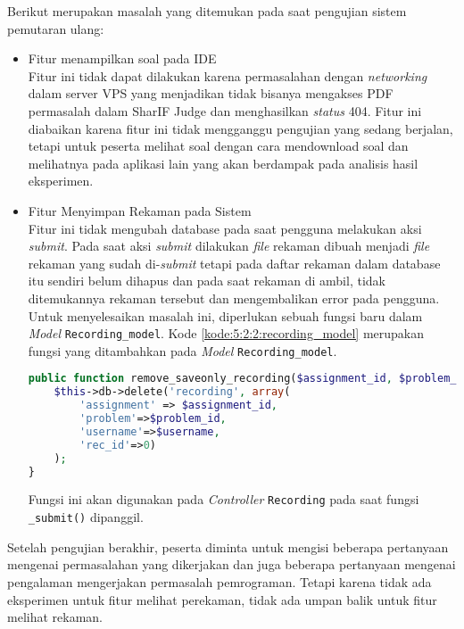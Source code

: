 Berikut merupakan masalah yang ditemukan pada saat pengujian sistem pemutaran ulang:

\begin{itemize}
    \item Fitur menampilkan soal pada IDE \\
    Fitur ini tidak dapat dilakukan karena permasalahan dengan \textit{networking} dalam server VPS yang menjadikan tidak bisanya mengakses PDF permasalah dalam SharIF Judge dan menghasilkan \textit{status} 404. Fitur ini diabaikan karena fitur ini tidak mengganggu pengujian yang sedang berjalan, tetapi untuk peserta melihat soal dengan cara mendownload soal dan melihatnya pada aplikasi lain yang akan berdampak pada analisis hasil eksperimen.
    \item Fitur Menyimpan Rekaman pada Sistem \\
    Fitur ini tidak mengubah database pada saat pengguna melakukan aksi \textit{submit}. Pada saat aksi \textit{submit} dilakukan \textit{file} rekaman dibuah menjadi \textit{file} rekaman yang sudah di-\textit{submit} tetapi pada daftar rekaman dalam database itu sendiri belum dihapus dan pada saat rekaman di ambil, tidak ditemukannya rekaman tersebut dan mengembalikan error pada pengguna. Untuk menyelesaikan masalah ini, diperlukan sebuah fungsi baru dalam \textit{Model} \verb|Recording_model|. Kode \ref{kode:5:2:2:recording_model} merupakan fungsi yang ditambahkan pada \textit{Model} \verb|Recording_model|. 

    \begin{lstlisting}[language=php, caption={Fungsi tambahan pada \textit{Recording model}}, label=kode:5:2:2:recording_model]
public function remove_saveonly_recording($assignment_id, $problem_id, $username) {
    $this->db->delete('recording', array(
        'assignment' => $assignment_id, 
        'problem'=>$problem_id, 
        'username'=>$username, 
        'rec_id'=>0)
    );
}
    \end{lstlisting}

    Fungsi ini akan digunakan pada \textit{Controller} \verb|Recording| pada saat fungsi \verb|_submit()| dipanggil.

\end{itemize}

Setelah pengujian berakhir, peserta diminta untuk mengisi beberapa pertanyaan mengenai permasalahan yang dikerjakan dan juga beberapa pertanyaan mengenai pengalaman mengerjakan permasalah pemrograman. Tetapi karena tidak ada eksperimen untuk fitur melihat perekaman, tidak ada umpan balik untuk fitur melihat rekaman. 

